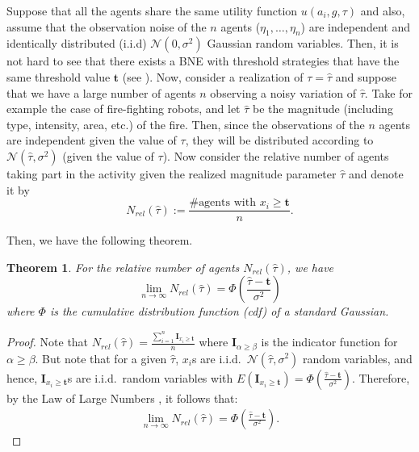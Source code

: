 \documentclass[conference]{ieeeconf}
\newtheorem{theorem}{Theorem}
\def\td{\mathbf{t}}   %
\begin{document}
Suppose that all the agents share the same utility function $u(a_i,g,\tau)$ and also, assume that the observation noise of the $n$ agents ($\eta_1,\ldots,\eta_n$) are independent and identically distributed (i.i.d) $\mathcal{N}(0,\sigma^2)$ Gaussian random variables. Then, it is not hard to see that there exists a BNE with threshold strategies that have the same threshold value $\td$ (see  \cite{Morris2000}). Now, consider a realization of $\tau=\hat{\tau}$ and suppose that we have a large number of agents $n$ observing a noisy variation of $\hat{\tau}$. Take for example the case of fire-fighting robots, and let $\hat{\tau}$ be the magnitude (including type, intensity, area, etc.) of the fire. Then, since the observations of the $n$ agents are independent given the value of $\tau$, they will be distributed according to $\mathcal{N}(\hat{\tau},\sigma^2)$ (given the value of $\tau$). Now consider the relative number of agents taking part in the activity given the realized magnitude parameter $\hat{\tau}$ and denote it by 
\begin{equation}\label{eqn:Nrel}
	N_{rel}(\hat{\tau}):=\frac{\#\text{agents with }x_i\geq \td}{n}.
\end{equation}

Then, we have the following theorem.
\begin{theorem}\label{thrm:relativefrequency}
For the relative number of agents $N_{rel}(\hat{\tau})$, we have
\begin{equation}
\lim_{n\to\infty}N_{rel}(\hat{\tau})=\Phi(\frac{\hat{\tau}-\td}{\sigma^2})
\end{equation}
where $\Phi$ is the cumulative distribution function (cdf) of a standard Gaussian. 
\end{theorem}
\begin{proof}
Note that $N_{rel}(\hat{\tau})=\frac{\sum_{i=1}^n\mathbf{I}_{x_i\geq \td}}{n}$ where $\mathbf{I}_{\alpha\geq \beta}$ is the indicator function for $\alpha\geq \beta$. But note that for a given $\hat{\tau}$, $x_i$s are i.i.d.\ $\mathcal{N}(\hat{\tau},\sigma^2)$ random variables, and hence, $\mathbf{I}_{x_i\geq \td}$s are i.i.d.\ random variables with $E(\mathbf{I}_{x_i\geq \td})=\Phi(\frac{\hat{\tau}-\td}{\sigma^2})$. Therefore, by the Law of Large Numbers \cite{durrett2010}, it follows that:
\vspace{-5px}
\begin{align*}
\lim_{n\to\infty}N_{rel}(\hat{\tau})=\Phi(\frac{\hat{\tau}-\td}{\sigma^2}).
\end{align*}
\vspace{-5px}
\end{proof}
\end{document}
